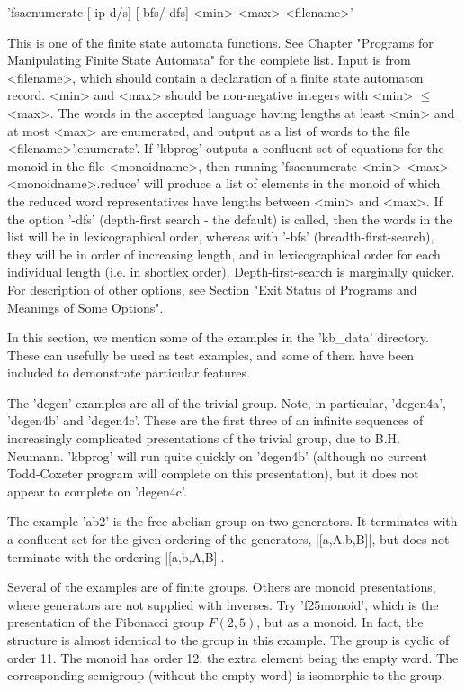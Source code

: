 
'fsaenumerate  [-ip d/s] [-bfs/-dfs] <min> <max> <filename>' 

This is one of the finite state automata functions. See Chapter 
"Programs for Manipulating Finite State Automata" for the complete list.
Input is from <filename>, which should contain a declaration of a finite
state automaton record.
<min> and <max> should be non-negative integers with <min> $\le$ <max>.
The words in the accepted language having lengths at least <min> and at
most <max> are enumerated, and output as a list of words to the file
<filename>'.enumerate'.
If 'kbprog' outputs a confluent set of equations for the monoid in the file
<monoidname>, then running 'fsaenumerate <min> <max> <monoidname>.reduce'
will produce a list of elements in the monoid of which the reduced 
word representatives have lengths between <min> and <max>.
If the option '-dfs' (depth-first search - the default) is called,
then the words
in the list will be in lexicographical order, whereas with '-bfs'
(breadth-first-search), they will be in order of increasing length, and in
lexicographical order for each individual length (i.e. in shortlex order).
Depth-first-search is marginally quicker.
For description of other options, see Section
"Exit Status of Programs and Meanings of Some Options".

In this section, we mention some of the examples in the 'kb\_data' directory.
These can usefully be used as test examples, and some of them have been
included to demonstrate particular features.

The 'degen' examples  are all of the trivial group. Note, in particular,
'degen4a', 'degen4b' and 'degen4c'. These are the first three of an
infinite sequences of increasingly complicated presentations of the
trivial group, due to B.H. Neumann. 'kbprog' will run quite quickly on
'degen4b' (although no current Todd-Coxeter program will complete on this
presentation), but it does not appear to complete on 'degen4c'.

The example 'ab2' is the free abelian group on two generators.
It terminates with a confluent set for the given ordering of the
generators, |[a,A,b,B]|, but does not terminate with the ordering |[a,b,A,B]|.

Several of the examples are of finite groups. 
Others are monoid presentations, where generators are not supplied with
inverses. Try 'f25monoid', which is the presentation of the Fibonacci group
$F(2,5)$, but as a monoid. In fact, the structure is almost identical to
the group in this example. The group is cyclic of order 11.
The monoid has order 12, the extra element being the empty word.
The corresponding semigroup (without the empty word) is isomorphic to the
group.

